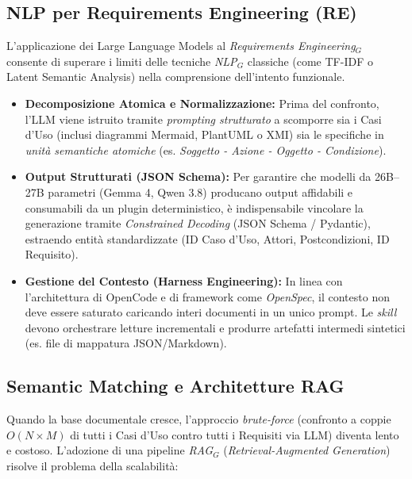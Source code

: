 \documentclass[a4paper, 11pt]{article}
\newcommand{\term}[1]{\textit{#1}$_G$} %
\begin{document}
\subsection{NLP per Requirements Engineering (RE)}
L'applicazione dei Large Language Models al \term{Requirements Engineering} consente di superare i limiti delle tecniche \term{NLP} classiche (come TF-IDF o Latent Semantic Analysis) nella comprensione dell'intento funzionale.

\begin{itemize}
    \item \textbf{Decomposizione Atomica e Normalizzazione:} Prima del confronto, l'LLM viene istruito tramite \textit{prompting strutturato} a scomporre sia i Casi d'Uso (inclusi diagrammi Mermaid, PlantUML o XMI) sia le specifiche in \textit{unità semantiche atomiche} (es. \textit{Soggetto - Azione - Oggetto - Condizione}).
    \item \textbf{Output Strutturati (JSON Schema):} Per garantire che modelli da 26B--27B parametri (Gemma 4, Qwen 3.8) producano output affidabili e consumabili da un plugin deterministico, è indispensabile vincolare la generazione tramite \textit{Constrained Decoding} (JSON Schema / Pydantic), estraendo entità standardizzate (ID Caso d'Uso, Attori, Postcondizioni, ID Requisito).
    \item \textbf{Gestione del Contesto (Harness Engineering):} In linea con l'architettura di OpenCode e di framework come \textit{OpenSpec}, il contesto non deve essere saturato caricando interi documenti in un unico prompt. Le \textit{skill} devono orchestrare letture incrementali e produrre artefatti intermedi sintetici (es. file di mappatura JSON/Markdown).
\end{itemize}

\subsection{Semantic Matching e Architetture RAG}
Quando la base documentale cresce, l'approccio \textit{brute-force} (confronto a coppie $O(N \times M)$ di tutti i Casi d'Uso contro tutti i Requisiti via LLM) diventa lento e costoso. L'adozione di una pipeline \term{RAG} (\textit{Retrieval-Augmented Generation}) risolve il problema della scalabilità:
\end{document}
